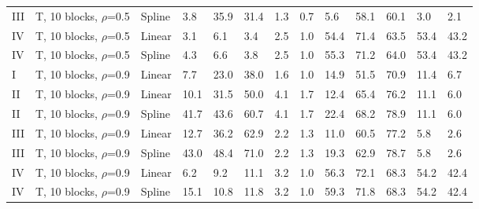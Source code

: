\documentclass{article}\usepackage[]{graphicx}\usepackage[]{color}
\begin{document}
\begin{table}[ht]
\begin{tabular}{lll|lllll|lllll}
  III & T, 10 blocks, $\rho$=0.5 & Spline & 3.8 & 35.9 & 31.4 & 1.3 & 0.7 & 5.6 & 58.1 & 60.1 & 3.0 & 2.1 \\ 
  IV & T, 10 blocks, $\rho$=0.5 & Linear & 3.1 & 6.1 & 3.4 & 2.5 & 1.0 & 54.4 & 71.4 & 63.5 & 53.4 & 43.2 \\ 
  IV & T, 10 blocks, $\rho$=0.5 & Spline & 4.3 & 6.6 & 3.8 & 2.5 & 1.0 & 55.3 & 71.2 & 64.0 & 53.4 & 43.2 \\ 
   \hline
I & T, 10 blocks, $\rho$=0.9 & Linear & 7.7 & 23.0 & 38.0 & 1.6 & 1.0 & 14.9 & 51.5 & 70.9 & 11.4 & 6.7 \\ 
  II & T, 10 blocks, $\rho$=0.9 & Linear & 10.1 & 31.5 & 50.0 & 4.1 & 1.7 & 12.4 & 65.4 & 76.2 & 11.1 & 6.0 \\ 
  II & T, 10 blocks, $\rho$=0.9 & Spline & 41.7 & 43.6 & 60.7 & 4.1 & 1.7 & 22.4 & 68.2 & 78.9 & 11.1 & 6.0 \\ 
  III & T, 10 blocks, $\rho$=0.9 & Linear & 12.7 & 36.2 & 62.9 & 2.2 & 1.3 & 11.0 & 60.5 & 77.2 & 5.8 & 2.6 \\ 
  III & T, 10 blocks, $\rho$=0.9 & Spline & 43.0 & 48.4 & 71.0 & 2.2 & 1.3 & 19.3 & 62.9 & 78.7 & 5.8 & 2.6 \\ 
  IV & T, 10 blocks, $\rho$=0.9 & Linear & 6.2 & 9.2 & 11.1 & 3.2 & 1.0 & 56.3 & 72.1 & 68.3 & 54.2 & 42.4 \\ 
  IV & T, 10 blocks, $\rho$=0.9 & Spline & 15.1 & 10.8 & 11.8 & 3.2 & 1.0 & 59.3 & 71.8 & 68.3 & 54.2 & 42.4 \\ 
   \hline
\end{tabular}
\end{table}
\end{document}
